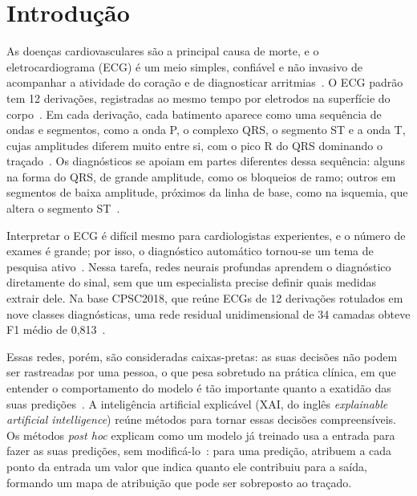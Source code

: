 \section{Introdução}\label{sec:introducao}

As doenças cardiovasculares são a principal causa de morte, e o eletrocardiograma (ECG) é um meio simples, confiável e não invasivo de acompanhar a atividade do coração e de diagnosticar arritmias~\cite{zhang2021}. O ECG padrão tem 12 derivações, registradas ao mesmo tempo por eletrodos na superfície do corpo~\cite{zhang2021}. Em cada derivação, cada batimento aparece como uma sequência de ondas e segmentos, como a onda P, o complexo QRS, o segmento ST e a onda T, cujas amplitudes diferem muito entre si, com o pico R do QRS dominando o traçado~\cite{gumpfer2026}. Os diagnósticos se apoiam em partes diferentes dessa sequência: alguns na forma do QRS, de grande amplitude, como os bloqueios de ramo; outros em segmentos de baixa amplitude, próximos da linha de base, como na isquemia, que altera o segmento ST~\cite{gumpfer2026}.

Interpretar o ECG é difícil mesmo para cardiologistas experientes, e o número de exames é grande; por isso, o diagnóstico automático tornou-se um tema de pesquisa ativo~\cite{zhang2021}. Nessa tarefa, redes neurais profundas aprendem o diagnóstico diretamente do sinal, sem que um especialista precise definir quais medidas extrair dele. Na base CPSC2018, que reúne ECGs de 12 derivações rotulados em nove classes diagnósticas, uma rede residual unidimensional de 34 camadas obteve F1 médio de 0,813~\cite{zhang2021}.

Essas redes, porém, são consideradas caixas-pretas: as suas decisões não podem ser rastreadas por uma pessoa, o que pesa sobretudo na prática clínica, em que entender o comportamento do modelo é tão importante quanto a exatidão das suas predições~\cite{zhang2021}. A inteligência artificial explicável (XAI, do inglês \textit{explainable artificial intelligence}) reúne métodos para tornar essas decisões compreensíveis. Os métodos \emph{post hoc} explicam como um modelo já treinado usa a entrada para fazer as suas predições, sem modificá-lo~\cite{turbe2023}: para uma predição, atribuem a cada ponto da entrada um valor que indica quanto ele contribuiu para a saída, formando um mapa de atribuição que pode ser sobreposto ao traçado.

